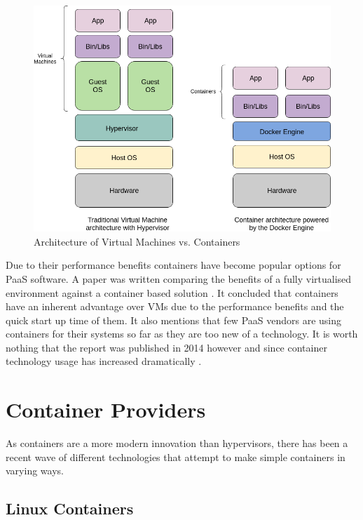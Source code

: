 \begin{figure}[h!]
    \centering
    \includegraphics[scale=0.4]{res/Virtualisation.png}
    \caption{Architecture of Virtual Machines vs. Containers}
    \label{fig:architecture}
\end{figure}

Due to their performance benefits containers have become popular options for PaaS software. A paper was written comparing the benefits of a fully virtualised environment against a container based solution \cite{contsvsvirt}. It concluded that containers have an inherent advantage over VMs due to the performance benefits and the quick start up time of them. It also mentions that few PaaS vendors are using containers for their systems so far as they are too new of a technology. It is worth nothing that the report was published in 2014 however and since container technology usage has increased dramatically \cite{container-report}.

\section{Container Providers}

As containers are a more modern innovation than hypervisors, there has been a recent wave of different technologies that attempt to make simple containers in varying ways.

\subsection{Linux Containers}

